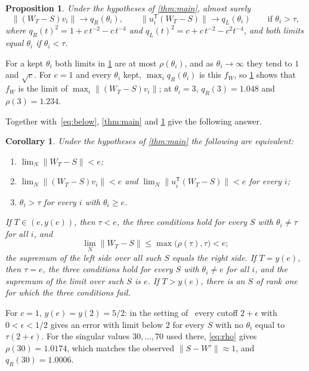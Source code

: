 \documentclass[11pt]{amsart}
\newtheorem{cor}[thm]{Corollary}
\newtheorem{prop}[thm]{Proposition}
\theoremstyle{remark}
\numberwithin{equation}{section}
\begin{document}
\begin{prop}\label{prop:direction}
Under the hypotheses of \cref{thm:main}, almost surely
\[
\|(W_T-S)v_i\|\to q_R(\theta_i),\qquad \|u_i^{\mathsf T}(W_T-S)\|\to q_L(\theta_i)\qquad\text{if }\theta_i>\tau,
\]
where $q_R(t)^2=1+c\,t^{-2}-c\,t^{-4}$ and $q_L(t)^2=c+c\,t^{-2}-c^2t^{-4}$, and both limits equal $\theta_i$ if $\theta_i<\tau$.
\end{prop}

For a kept $\theta_i$ both limits in \cref{prop:direction} are at most $\rho(\theta_i)$, and as $\theta_i\to\infty$ they tend to $1$ and $\sqrt c$. For $c=1$ and every $\theta_i$ kept, $\max_i q_R(\theta_i)$ is this $f_W$, so \cref{prop:direction} shows that $f_W$ is the limit of $\max_i\|(W_T-S)v_i\|$; at $\theta_i=3$, $q_R(3)=1.048$ and $\rho(3)=1.234$.

Together with~\eqref{eq:below}, \cref{thm:main} and \cref{prop:direction} give the following answer.

\begin{cor}\label{cor:criterion}
Under the hypotheses of \cref{thm:main} the following are equivalent:
\begin{enumerate}
\item $\lim_N\|W_T-S\|<e$;
\item $\lim_N\|(W_T-S)v_i\|<e$ and $\lim_N\|u_i^{\mathsf T}(W_T-S)\|<e$ for every $i$;
\item $\theta_i>\tau$ for every $i$ with $\theta_i\ge e$.
\end{enumerate}
If $T\in(e,y(e))$, then $\tau<e$, the three conditions hold for every $S$ with $\theta_i\ne\tau$ for all $i$, and
\begin{equation}\label{eq:uniform}
\lim_N\|W_T-S\|\le\max\bigl(\rho(\tau),\tau\bigr)<e ;
\end{equation}
the supremum of the left side over all such $S$ equals the right side. If $T=y(e)$, then $\tau=e$, the three conditions hold for every $S$ with $\theta_i\ne e$ for all $i$, and the supremum of the limit over such $S$ is $e$. If $T>y(e)$, there is an $S$ of rank one for which the three conditions fail.
\end{cor}

For $c=1$, $y(e)=y(2)=5/2$: in the setting of~\cite[Example~5.5]{BSSZ} every cutoff $2+\epsilon$ with $0<\epsilon<1/2$ gives an error with limit below $2$ for every $S$ with no $\theta_i$ equal to $\tau(2+\epsilon)$. For the singular values $30,\dots,70$ used there, \eqref{eq:rho} gives $\rho(30)=1.0174$, which matches the observed $\|S-W'\|\approx1$, and $q_R(30)=1.0006$.
\end{document}
